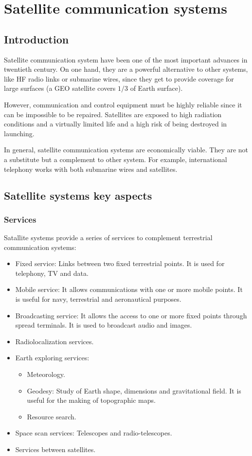 \documentclass[
	12pt,
	twoside
]{book}
\begin{document}
\chapter{Satellite communication systems}

\section{Introduction}

Satellite communication system have been one of the most important advances in twentieth century. On one hand, they are a powerful alternative to other systems, like HF radio links or submarine wires, since they get to provide coverage for large surfaces (a GEO satellite covers $1/3$ of Earth surface).

However, communication and control equipment must be highly reliable since it can be impossible to be repaired. Satellites are exposed to high radiation conditions and a virtually limited life and a high risk of being destroyed in launching.

In general, satellite communication systems are economically viable. They are not a substitute but a complement to other system. For example, international telephony works with both submarine wires and satellites.

\section{Satellite systems key aspects}

\subsection{Services}

Satallite systems provide a series of services to complement terrestrial communication systems:
\begin{itemize}
	\item Fixed service: Links between two fixed terrestrial points. It is used for telephony, TV and data.
	\item Mobile service: It allows communications with one or more mobile points. It is useful for navy, terrestrial and aeronautical purposes.
	\item Broadcasting service: It allows the access to one or more fixed points through spread terminals. It is used to broadcast audio and images.
	\item Radiolocalization services.
	\item {
		Earth exploring services:
		\begin{itemize}
			\item Meteorology.
			\item Geodesy: Study of Earth shape, dimensions and gravitational field. It is useful for the making of topographic maps.
			\item Resource search.
		\end{itemize}
	}
	\item Space scan services: Telescopes and radio-telescopes.
	\item Services between satellites.
\end{itemize}
\end{document}
